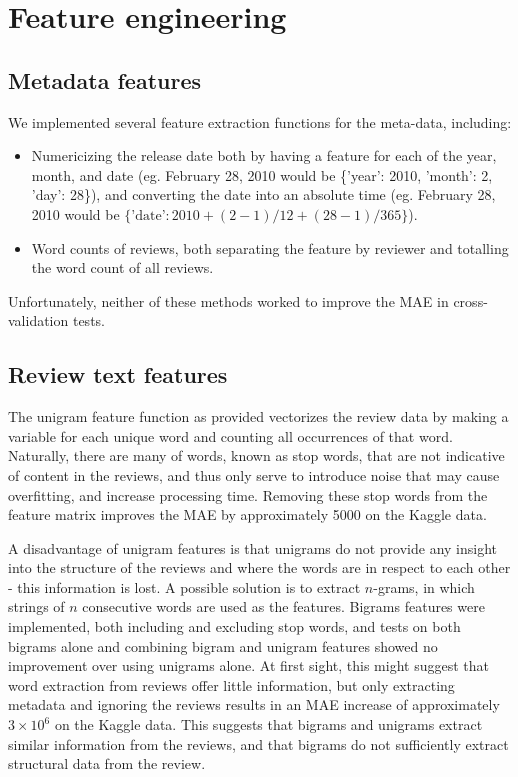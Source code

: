 \documentclass[11pt]{amsart}
\begin{document}
\section{Feature engineering}

\subsection{Metadata features}
We implemented several feature extraction functions for the meta-data, including:
\begin{itemize}
	\item Numericizing the release date both by having a feature for each of the year, month, and date (eg. February 28, 2010 would be \{'year': 2010, 'month': 2, 'day': 28\}), and converting the date into an absolute time (eg. February 28, 2010 would be $\{\text{'date'}: 2010 + (2-1)/12 + (28-1)/365\}$).
	\item Word counts of reviews, both separating the feature by reviewer and totalling the word count of all reviews.
\end{itemize}
Unfortunately, neither of these methods worked to improve the MAE in cross-validation tests.

\subsection{Review text features}
The unigram feature function as provided vectorizes the review data by making a variable for each unique word and counting all occurrences of that word. Naturally, there are many of words, known as stop words, that are not indicative of content in the reviews, and thus only serve to introduce noise that may cause overfitting, and increase processing time. Removing these stop words from the feature matrix improves the MAE by approximately 5000 on the Kaggle data.

A disadvantage of unigram features is that unigrams do not provide any insight into the structure of the reviews and where the words are in respect to each other - this information is lost. A possible solution is to extract $n$-grams, in which strings of $n$ consecutive words are used as the features. Bigrams features were implemented, both including and excluding stop words, and tests on both bigrams alone and combining bigram and unigram features showed no improvement over using unigrams alone. At first sight, this might suggest that word extraction from reviews offer little information, but only extracting metadata and ignoring the reviews results in an MAE increase of approximately $3\times10^6$ on the Kaggle data. This suggests that bigrams and unigrams extract similar information from the reviews, and that bigrams do not sufficiently extract structural data from the review.
\end{document}
